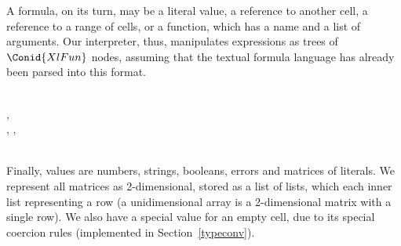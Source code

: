 A formula, on its turn, may be a literal value, a reference to another cell, a
reference to a range of cells, or a function, which has a name and a list of
arguments. Our interpreter, thus, manipulates expressions as trees of \ensuremath{\Conid{XlFun}}
nodes, assuming that the textual formula language has already been parsed into
this format.

\begin{hscode}\SaveRestoreHook
{}%
%
%
%
%
%
%
\>[B]{}\;\<[17]%
\>[17]{}\mathrel{=}{}\<[17E]%
\>[20]{}\;{}\<[27]%
\>[27]{}\<[E]%
\\
\>[17]{}\mid {}\<[17E]%
\>[20]{}\;{}\<[27]%
\>[27]{}\llparenthesis \cdot , \cdot \rrparenthesis {}\<[E]%
\\
\>[17]{}\mid {}\<[17E]%
\>[20]{}\;{}\<[27]%
\>[27]{}\llparenthesis \cdot , \cdot \rrparenthesis \;\llparenthesis \cdot , \cdot \rrparenthesis {}\<[E]%
\\
\>[17]{}\mid {}\<[17E]%
\>[20]{}\;{}\<[27]%
\>[27]{}\<[E]%
\\
\>[B]{}\<[4]%
\>[4]{}\;\<[E]%
\ColumnHook
\end{hscode}\resethooks

Finally, values are numbers, strings, booleans, errors and matrices of
literals. We represent all matrices as 2-dimensional, stored as a list of
lists, which each inner list representing a row (a unidimensional array is a
2-dimensional matrix with a single row). We also have a special value
for an empty cell, due to its special coercion rules (implemented in
Section~\ref{typeconv}).

